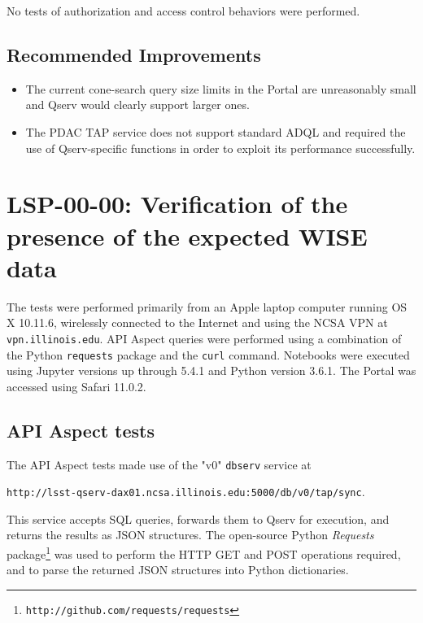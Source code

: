 \documentclass[DM,lsstdraft,STR,toc]{lsstdoc}
\begin{document}
No tests of authorization and access control behaviors were performed.


\subsection{Recommended Improvements}
\label{sect:recommendations}

\begin{itemize}

\item{The current cone-search query size limits in the Portal are unreasonably small and Qserv would clearly support larger ones.}
\item{The PDAC TAP service does not support standard ADQL and required the use of Qserv-specific functions in order to exploit its performance successfully.}

\end{itemize}



\section{LSP-00-00: Verification of the presence of the expected WISE data}
\label{sect:detail-lsp-00-00}

The tests were performed primarily from an Apple laptop computer running OS X 10.11.6, wirelessly connected to the Internet and using the NCSA VPN at \texttt{vpn.illinois.edu}.
API Aspect queries were performed using a combination of the Python \texttt{requests} package and the \texttt{curl} command.
Notebooks were executed using Jupyter versions up through 5.4.1 and Python version 3.6.1.
The Portal was accessed using Safari 11.0.2.

\subsection{API Aspect tests}

The API Aspect tests made use of the "v0" \texttt{dbserv} service at 

\begin{center}
\texttt{http://lsst-qserv-dax01.ncsa.illinois.edu:5000/db/v0/tap/sync}.
\end{center}

This service accepts SQL queries, forwards them to Qserv for execution, and returns the results as JSON structures.
The open-source Python \emph{Requests} package\footnote{\texttt{http://github.com/requests/requests}} was used to perform the HTTP GET and POST operations required, and to parse the returned JSON structures into Python dictionaries.
\end{document}
